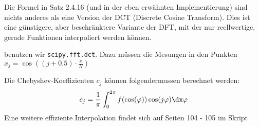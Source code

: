 \inlineremark Die Formel in Satz 2.4.16 (und in der eben erwähnten Implementierung) sind nichts anderes als eine Version der DCT (Discrete Cosine Transform).
Dies ist eine günstigere, aber beschränktere Variante der DFT, mit der nur reellwertige, gerade Funktionen interpoliert werden können.

\innumpy benutzen wir \texttt{scipy.fft.dct}. Dazu müssen die Mesungen in den Punkten $x_j = \cos\left( (j + 0.5) \cdot \frac{\pi}{N} \right)$

\inlineremark Die Chebyshev-Koeffizienten $c_j$ können folgendermassen berechnet werden:
\rmvspace
\begin{align*}
    c_j = \frac{1}{\pi} \int_{0}^{2\pi} f(\cos(\varphi)) \cos(j \varphi) \dx \varphi
\end{align*}
Eine weitere effiziente Interpolation findet sich auf Seiten 104 - 105 im Skript
